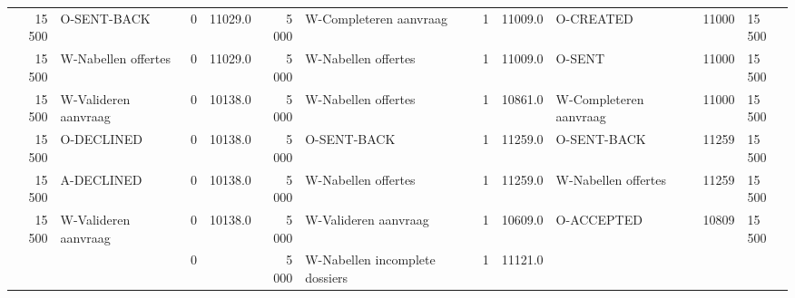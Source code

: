 \begin{tabular}{rlrlrlrllll}
15 500 & O-SENT-BACK & 0 & 11029.0 & 5 000 & W-Completeren aanvraag & 1 & 11009.0 & O-CREATED & 11000 & 15 500 \\
15 500 & W-Nabellen offertes & 0 & 11029.0 & 5 000 & W-Nabellen offertes & 1 & 11009.0 & O-SENT & 11000 & 15 500 \\
15 500 & W-Valideren aanvraag & 0 & 10138.0 & 5 000 & W-Nabellen offertes & 1 & 10861.0 & W-Completeren aanvraag & 11000 & 15 500 \\
15 500 & O-DECLINED & 0 & 10138.0 & 5 000 & O-SENT-BACK & 1 & 11259.0 & O-SENT-BACK & 11259 & 15 500 \\
15 500 & A-DECLINED & 0 & 10138.0 & 5 000 & W-Nabellen offertes & 1 & 11259.0 & W-Nabellen offertes & 11259 & 15 500 \\
15 500 & W-Valideren aanvraag & 0 & 10138.0 & 5 000 & W-Valideren aanvraag & 1 & 10609.0 & O-ACCEPTED & 10809 & 15 500 \\
 &  & 0 &  & 5 000 & W-Nabellen incomplete dossiers & 1 & 11121.0 &  &  &  \\
\bottomrule
\end{tabular}
